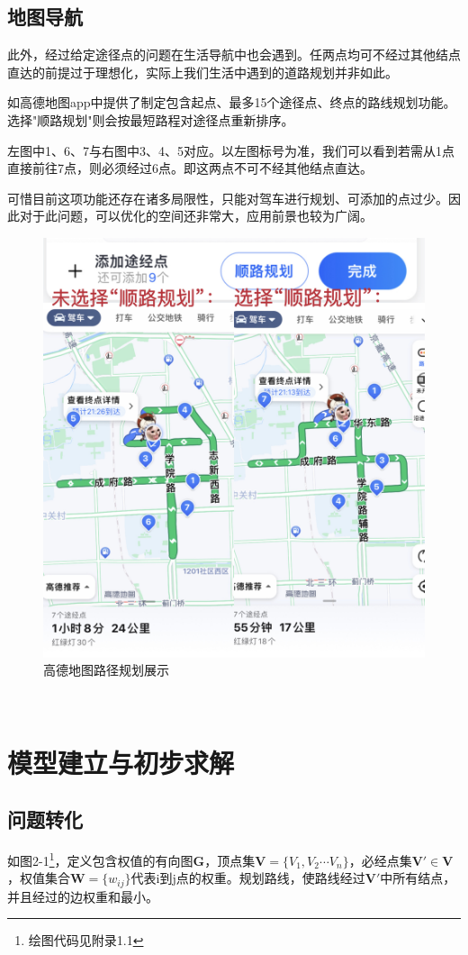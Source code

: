 \documentclass[12pt]{article}
\begin{document}
\subsection{地图导航}
此外，经过给定途径点的问题在生活导航中也会遇到。任两点均可不经过其他结点直达的前提过于理想化，实际上我们生活中遇到的道路规划并非如此。

如高德地图app中提供了制定包含起点、最多15个途径点、终点的路线规划功能。选择"顺路规划"则会按最短路程对途径点重新排序。

左图中1、6、7与右图中3、4、5对应。以左图标号为准，我们可以看到若需从1点直接前往7点，则必须经过6点。即这两点不可不经其他结点直达。

可惜目前这项功能还存在诸多局限性，只能对驾车进行规划、可添加的点过少。因此对于此问题，可以优化的空间还非常大，应用前景也较为广阔。
\newpage
\begin{figure}[t]
    \centering
    \includegraphics[width = 0.5 \textwidth]{assets/gdmap.jpeg}
    \caption{\label{fig:gdmap.jpeg}高德地图路径规划展示}
\end{figure}
~\
\newpage
\setcounter{figure}{0}

\section{模型建立与初步求解}
\subsection{问题转化}
如图2-1\footnote{绘图代码见附录1.1}，定义包含权值的有向图$\mathbf{G}$，顶点集$\mathbf{V}=\{V_{1},V_{2}\cdots V_{n}\}$，必经点集$\mathbf{V'}\in\mathbf{V}$，权值集合$\mathbf{W}=\{w_{ij}\}$代表i到j点的权重。规划路线，使路线经过$\mathbf{V'}$中所有结点，并且经过的边权重和最小。
\end{document}
